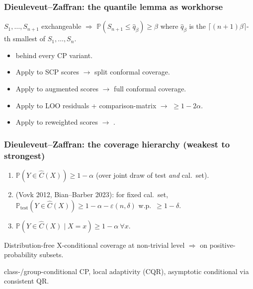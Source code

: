\documentclass[11pt, aspectratio=169, xcolor={dvipsnames}, usepdftitle=false]{beamer}
\begin{document}
\begin{frame}
\frametitle{Dieuleveut--Zaffran: the quantile lemma as workhorse}
\begin{lemma}
$S_1, \dots, S_{n+1}$ exchangeable $\Rightarrow$ $\mathbb{P}(S_{n+1} \leq \hat{q}_\beta) \geq \beta$ where $\hat{q}_\beta$ is the $\lceil (n+1)\beta\rceil$-th smallest of $S_1, \dots, S_n$.
\end{lemma}
\begin{itemize}
\item {} behind every CP variant.
\item Apply to SCP scores $\to$ split conformal coverage.
\item Apply to augmented scores $\to$ full conformal coverage.
\item Apply to LOO residuals + comparison-matrix $\to$  $\geq 1 - 2\alpha$.
\item Apply to reweighted scores $\to$ .
\end{itemize}
\end{frame}

\begin{frame}
\frametitle{Dieuleveut--Zaffran: the coverage hierarchy (weakest to strongest)}
\begin{enumerate}
\item {} $\mathbb{P}(Y \in \hat{C}(X)) \geq 1 - \alpha$ (over joint draw of test \emph{and} cal.\ set).
\item {} (Vovk 2012, Bian--Barber 2023): for fixed cal.\ set, $\mathbb{P}_{\text{test}}(Y \in \hat{C}(X)) \geq 1 - \alpha - \varepsilon(n, \delta)$ w.p.\ $\geq 1 - \delta$.
\item {} $\mathbb{P}(Y \in \hat{C}(X) \mid X = x) \geq 1 - \alpha\ \forall x$.
\end{enumerate}
\begin{lemma}
Distribution-free X-conditional coverage at non-trivial level $\Rightarrow$  on positive-probability subsets.
\end{lemma}
 class-/group-conditional CP, local adaptivity (CQR), asymptotic conditional via consistent QR.
\end{frame}
\end{document}
